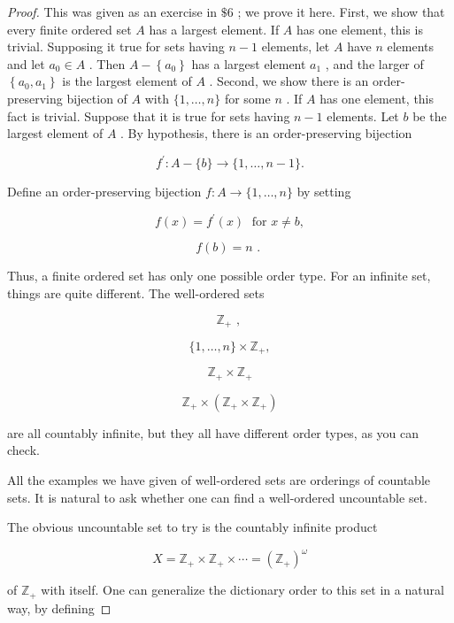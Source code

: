 \begin{proof}This was given as an exercise in \(\$ 6\) ; we prove it here. First, we show that every finite ordered set \(A\) has a largest element. If \(A\) has one element, this is trivial. Supposing it true for sets having \(n - 1\) elements, let \(A\) have \(n\) elements and let \({a}_{0} \in  A\) . Then \(A - \left\{  {a}_{0}\right\}\) has a largest element \({a}_{1}\) , and the larger of \(\left\{  {{a}_{0},{a}_{1}}\right\}\) is the largest element of \(A\) .
Second, we show there is an order-preserving bijection of \(A\) with \(\{ 1,\ldots ,n\}\) for some \(n\) . If \(A\) has one element, this fact is trivial. Suppose that it is true for sets having \(n - 1\) elements. Let \(b\) be the largest element of \(A\) . By hypothesis, there is an order-preserving bijection

\[
{f}^{\prime } : A - \{ b\}  \rightarrow  \{ 1,\ldots ,n - 1\} .
\]

Define an order-preserving bijection \(f : A \rightarrow  \{ 1,\ldots ,n\}\) by setting

\[
f\left( x\right)  = {f}^{\prime }\left( x\right) \;\text{ for }x \neq  b,
\]

\[
f\left( b\right)  = n\text{ . }
\]

Thus, a finite ordered set has only one possible order type. For an infinite set, things are quite different. The well-ordered sets

\[
{\mathbb{Z}}_{ + }\text{ , }
\]

\[
\{ 1,\ldots ,n\}  \times  {\mathbb{Z}}_{ + },
\]

\[
{\mathbb{Z}}_{ + } \times  {\mathbb{Z}}_{ + }
\]

\[
{\mathbb{Z}}_{ + } \times  \left( {{\mathbb{Z}}_{ + } \times  {\mathbb{Z}}_{ + }}\right)
\]

are all countably infinite, but they all have different order types, as you can check.

All the examples we have given of well-ordered sets are orderings of countable sets. It is natural to ask whether one can find a well-ordered uncountable set.

The obvious uncountable set to try is the countably infinite product

\[
X = {\mathbb{Z}}_{ + } \times  {\mathbb{Z}}_{ + } \times  \cdots  = {\left( {\mathbb{Z}}_{ + }\right) }^{\omega }
\]

of \({\mathbb{Z}}_{ + }\) with itself. One can generalize the dictionary order to this set in a natural way, by defining


\end{proof}
